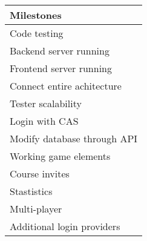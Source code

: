 \begin{table}
\centering
{}
\label{tab:milestones}
\begin{tabular}{l}
\textbf{Milestones}             \\\toprule
Code testing                    \\
Backend server running          \\
Frontend server running         \\
Connect entire achitecture      \\
Tester scalability              \\
Login with CAS                  \\
Modify database through API     \\
Working game elements           \\
Course invites                  \\
Stastistics                     \\
Multi-player                   \\
Additional login providers      \\\bottomrule
\end{tabular}
\end{table}
